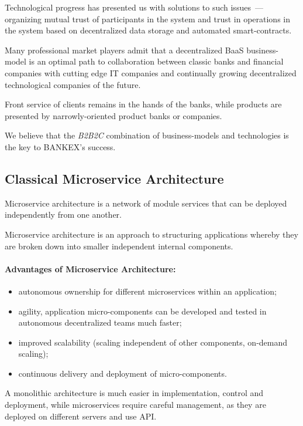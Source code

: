 \documentclass{article}
\begin{document}
\begin{multicols}{2}
Technological progress has presented us with solutions to such issues~--- organizing mutual trust of participants in the system and trust in operations in the system based on decentralized data storage and automated smart-contracts.

Many professional market players admit that a decentralized BaaS business-model is an optimal path to collaboration between classic banks and financial companies with cutting edge IT companies and continually growing decentralized technological companies of the future.

Front service of clients remains in the hands of the banks, while products are presented by narrowly-oriented product banks or companies. 

We believe that the \textit{B2B2C} combination of business-models and technologies is the key to BANKEX’s success.

\subsection{Classical Microservice Architecture}

Microservice architecture is a network of module services that can be deployed independently from one another.

Microservice architecture is an approach to structuring applications whereby they are broken down into smaller independent internal components.

\paragraph{Advantages of Microservice Architecture:}

\begin{itemize}
\item autonomous ownership for different microservices within an application;
\item agility, application micro-components can be developed and tested in autonomous decentralized teams much faster;
\item improved scalability (scaling independent of other components, on-demand scaling);
\item continuous delivery and deployment of micro-components.
\end{itemize}

A monolithic architecture is much easier in implementation, control and deployment, while microservices require careful management, as they are deployed on different servers and use API.


\end{multicols}
\end{document}
